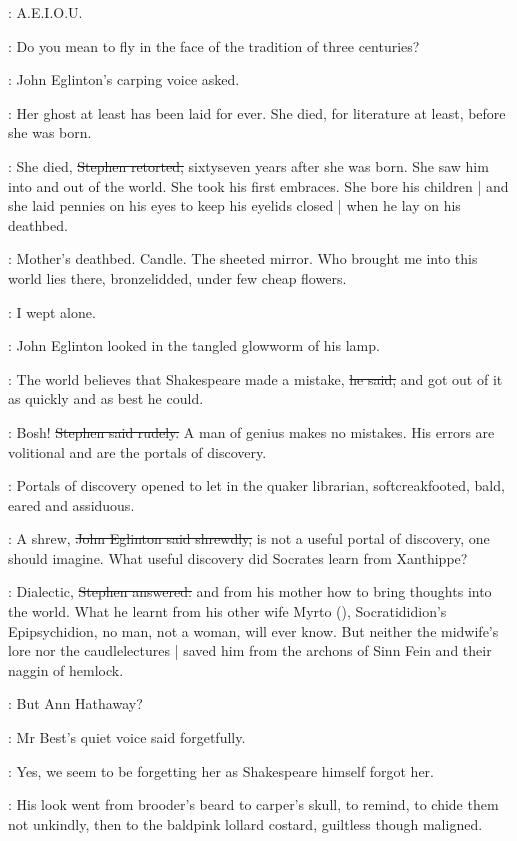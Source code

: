 \StephenInt:
A.E.I.O.U.

\eglinton:
Do you mean to fly in the face of the tradition of three centuries?

:
John Eglinton's carping voice asked.

\eglinton:
Her ghost at least has been laid for ever.
She died,
for literature at least,
before she was born.

\Stephen:
She died,
\sout{Stephen retorted,}
sixtyseven years after she was born.
She saw him into and out of the world.
She took his first embraces.
She bore his children |
and she laid pennies on his eyes to keep his eyelids closed |
when he lay
on his deathbed.

\StephenInt:
Mother's deathbed.
Candle.
The sheeted mirror.
Who brought me into this world lies there,
bronzelidded,
under few cheap flowers.

\StephenInt:
I wept alone.

:
John Eglinton looked in the tangled glowworm of his lamp.

\eglinton:
The world believes that Shakespeare made a mistake,
\sout{he said,}
and got out of it as quickly and as best he could.

\Stephen:
Bosh!
\sout{Stephen said rudely.}
A man of genius makes no mistakes.
His errors are volitional and are the portals of discovery.

:
Portals of discovery opened
to let in the quaker librarian,
softcreakfooted, bald, eared and assiduous.

\eglinton:
A shrew,
\sout{John Eglinton said shrewdly,}
is not a useful portal of discovery,
one should imagine.
What useful discovery did Socrates learn from Xanthippe?

\Stephen:
Dialectic,
\sout{Stephen answered:}
and from his mother how to bring thoughts into the world.
What he learnt from his other wife Myrto (),
Socratididion's Epipsychidion,
no man, not a woman, will ever know.
But neither the midwife's lore nor the caudlelectures |
saved him from the archons of Sinn Fein and their naggin of hemlock.

\best:
But Ann Hathaway?

:
Mr Best's quiet voice said forgetfully.

\best:
Yes,
we seem to be forgetting her as Shakespeare himself forgot her.

:
His look went from brooder's beard to carper's skull,
to remind,
to chide them not unkindly,
then to the baldpink lollard costard,
guiltless though maligned.

